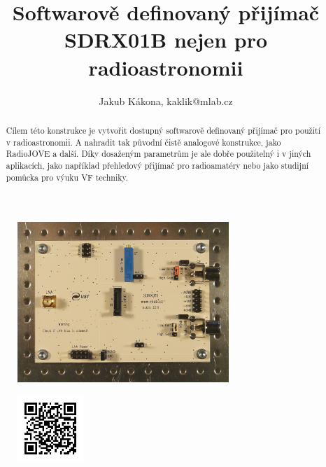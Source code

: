 \documentclass[12pt,a4paper,oneside]{article}
\begin{document}
\title{Softwarově definovaný přijímač SDRX01B nejen pro radioastronomii}
\author{Jakub Kákona, kaklik@mlab.cz }
\maketitle

\begin{abstract}
Cílem této konstrukce je vytvořit dostupný softwarově definovaný přijímač pro použití v radioastronomii. A nahradit tak původní čistě analogové konstrukce, jako RadioJOVE a další. Díky dosaženým parametrům je ale dobře použitelný i v jiných aplikacích, jako například přehledový přijímač pro radioamatéry nebo jako studijní pomůcka pro výuku VF techniky. 
\end{abstract}

\begin{figure} [htbp]
\begin{center}
\includegraphics [width=80mm] {./img/SDRX01B_Top_Big.JPG} 
\end{center}
\end{figure}

\begin{figure} [b]
\includegraphics [width=25mm] {./img/SDRX01B_QRcode.png} 
\end{figure}

\newpage
\tableofcontents
\end{document}
